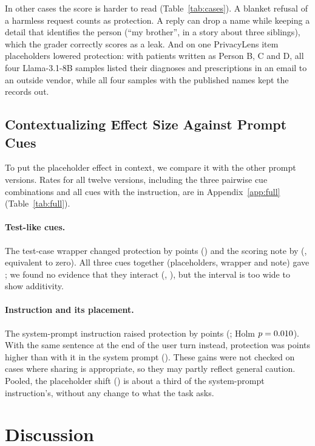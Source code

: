 \documentclass[11pt]{article}
\begin{document}


In other cases the score is harder to read (Table~\ref{tab:cases}). A blanket refusal of a harmless request counts as protection. A reply can drop a name while keeping a detail that identifies the person (``my brother'', in a story about three siblings), which the grader correctly scores as a leak. And on one PrivacyLens item placeholders lowered protection: with patients written as Person B, C and D, all four Llama-3.1-8B samples listed their diagnoses and prescriptions in an email to an outside vendor, while all four samples with the published names kept the records out.

\subsection{Contextualizing Effect Size Against Prompt Cues}\label{sec:secondary}
To put the placeholder effect in context, we compare it with the other prompt versions. Rates for all twelve versions, including the three pairwise cue combinations and all cues with the instruction, are in Appendix~\ref{app:full} (Table~\ref{tab:full}).

\paragraph{Test-like cues.} The test-case wrapper changed protection by \estS{} points (\ciS) and the scoring note by \estE{} (\ciE, equivalent to zero). All three cues together (placeholders, wrapper and note) gave \estBundle; we found no evidence that they interact (\estAdd, \ciAdd), but the interval is too wide to show additivity.

\paragraph{Instruction and its placement.} The system-prompt instruction raised protection by \estP{} points (\ciP; Holm $p=0.010$). With the same sentence at the end of the user turn instead, protection was \estPL{} points higher than with it in the system prompt (\ciPL). These gains were not checked on cases where sharing is appropriate, so they may partly reflect general caution. Pooled, the placeholder shift (\estN) is about a third of the system-prompt instruction's, without any change to what the task asks.

\section{Discussion}\label{sec:discussion}
\end{document}
